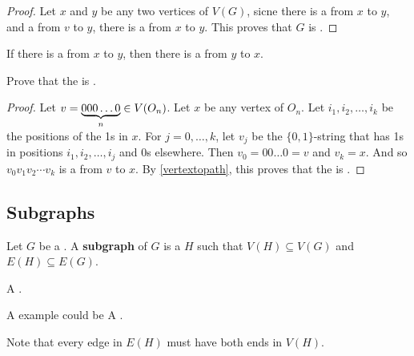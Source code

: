 \documentclass[english, 11pt]{article}
\begin{document}
\begin{proof}
  Let $x$ and $y$ be any two vertices of $V(G)$, sicne there is a  from $x$ to $y$, and a  from $v$ to $y$, there is a  from $x$ to $y$. This proves that $G$ is .
\end{proof}

\begin{note}
  If there is a  from $x$ to $y$, then there is a  from $y$ to $x$.
\end{note}

\begin{exmp}
  Prove that the  is .
  \begin{proof}
    Let $v = \underbrace{000\ldots0}_n \in V(O_n)$. Let $x$ be any vertex of $O_n$. Let $i_1,i_2,\ldots,i_k$ be the positions of the 1s in $x$. For $j = 0,\ldots,k$, let $v_j$ be the $\{0,1\}$-string that has 1s in positions $i_1,i_2,\ldots,i_j$ and 0s elsewhere. Then $v_0 = 00\ldots 0 = v$ and $v_k = x$. And so $v_0v_1v_2\cdots v_k$ is a  from $v$ to $x$. By \autoref{vertextopath}, this proves that the  is .
  \end{proof}
\end{exmp}

\subsection{Subgraphs}

\begin{defn}[subgraph]\label{subgraph}
Let $G$ be a . A \textbf{subgraph} of $G$ is a  $H$ such that $V(H) \subseteq V(G)$ and $E(H) \subseteq E(G)$.
\end{defn}

\begin{exmp}
  A .
    \begin{center}
\end{center}
A  example could be
  A .
    \begin{center}
\end{center}
Note that every edge in $E(H)$ must have both ends in $V(H)$.
\end{exmp}
\end{document}
